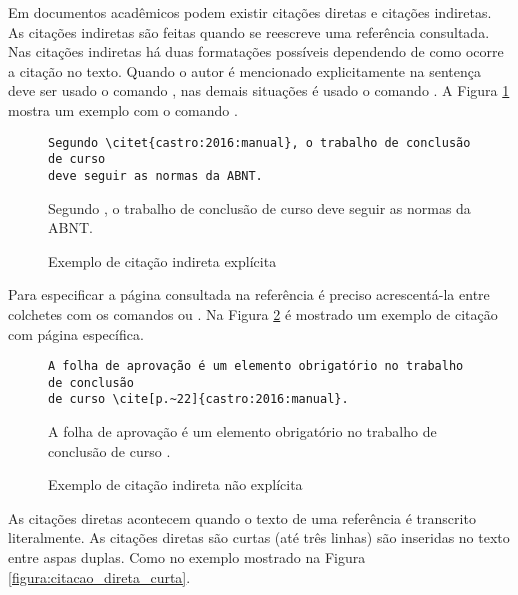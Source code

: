 Em documentos acadêmicos podem existir citações diretas e citações indiretas. As citações indiretas são feitas quando se reescreve uma referência consultada. Nas citações indiretas há duas formatações possíveis dependendo de como ocorre a citação no texto. Quando o autor é mencionado explicitamente na sentença deve ser usado o comando , nas demais situações é usado o comando . A Figura \ref{figura:citacao_indireta_explicita} mostra um exemplo com o comando .

\begin{figure}[htb]
\hrulefill

\begin{verbatim}
Segundo \citet{castro:2016:manual}, o trabalho de conclusão de curso
deve seguir as normas da ABNT.
\end{verbatim}

\hrulefill

Segundo \citet{castro:2016:manual}, o trabalho de conclusão de curso deve seguir as normas da ABNT.

\hrulefill

\caption{Exemplo de citação indireta explícita} \label{figura:citacao_indireta_explicita}
\end{figure}

Para especificar a página consultada na referência é preciso acrescentá-la entre colchetes com os comandos  ou . Na Figura \ref{figura:citacao_indireta_pagina} é mostrado um exemplo de citação com página específica.

\begin{figure}[htb]
\hrulefill

\begin{verbatim}
A folha de aprovação é um elemento obrigatório no trabalho de conclusão
de curso \cite[p.~22]{castro:2016:manual}.
\end{verbatim}

\hrulefill

A folha de aprovação é um elemento obrigatório no trabalho de conclusão de curso \cite[p.~22]{castro:2016:manual}.

\hrulefill

\caption{Exemplo de citação indireta não explícita} \label{figura:citacao_indireta_pagina}
\end{figure}

As citações diretas acontecem quando o texto de uma referência é transcrito literalmente. As citações diretas são curtas (até três linhas) são inseridas no texto entre aspas duplas. Como no exemplo mostrado na Figura \ref{figura:citacao_direta_curta}.

